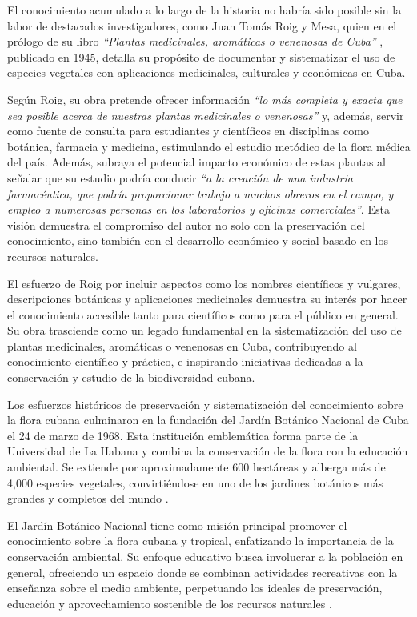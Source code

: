 El conocimiento acumulado a lo largo de la historia no habría sido posible sin la labor 
de destacados investigadores, como Juan Tomás Roig y Mesa, quien en el prólogo 
de su libro \textit{``Plantas medicinales, aromáticas o venenosas de Cuba''} \cite{Roig1945}, 
publicado en 1945, detalla su propósito de documentar y sistematizar el uso de especies 
vegetales con aplicaciones medicinales, culturales y económicas en Cuba. 

Según Roig, su obra pretende ofrecer información \textit{“lo más completa y exacta que sea posible acerca de nuestras plantas medicinales o venenosas”} 
y, además, servir como fuente de consulta para estudiantes y científicos en disciplinas como botánica, farmacia y medicina, 
estimulando el estudio metódico de la flora médica del país. Además, subraya el potencial impacto 
económico de estas plantas al señalar que su estudio podría conducir 
\textit{“a la creación de una industria farmacéutica, que podría proporcionar trabajo a muchos obreros en el campo, y empleo a numerosas personas en los laboratorios y oficinas comerciales”}. 
Esta visión demuestra el compromiso del autor no solo con la preservación del conocimiento, 
sino también con el desarrollo económico y social basado en los recursos naturales.

El esfuerzo de Roig por incluir aspectos como los nombres científicos y vulgares, 
descripciones botánicas y aplicaciones medicinales demuestra su interés por hacer 
el conocimiento accesible tanto para científicos como para el público en general. 
Su obra trasciende como un legado fundamental en la sistematización del uso de plantas 
medicinales, aromáticas o venenosas en Cuba, contribuyendo al conocimiento científico y práctico, 
e inspirando iniciativas dedicadas a la conservación y estudio de la biodiversidad cubana.

Los esfuerzos históricos de preservación y sistematización del conocimiento sobre 
la flora cubana culminaron en la fundación del Jardín Botánico Nacional de Cuba 
el 24 de marzo de 1968. Esta institución emblemática forma parte de la 
Universidad de La Habana y combina la conservación de la flora con la educación 
ambiental. Se extiende por aproximadamente 600 hectáreas y alberga más de 4,000 
especies vegetales, convirtiéndose en uno de los jardines botánicos más grandes y 
completos del mundo \cite{EcuredJBNC}.

El Jardín Botánico Nacional tiene como misión principal promover el conocimiento 
sobre la flora cubana y tropical, enfatizando la importancia de la conservación 
ambiental. Su enfoque educativo busca involucrar a la población en general, 
ofreciendo un espacio donde se combinan actividades recreativas con la enseñanza 
sobre el medio ambiente, perpetuando los ideales de preservación, educación y 
aprovechamiento sostenible de los recursos naturales \cite{CadenaHabana2022}.

